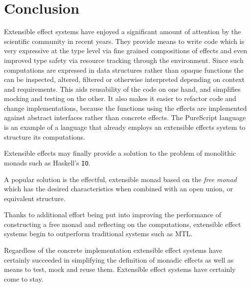 \section{Conclusion}

Extensible effect systems have enjoyed a significant amount of attention by the
scientific community in recent years. They provide means to write code which is
very expressive at the type level via fine grained compositions of effects and
even improved type safety via resource tracking through the environment. Since
such computations are expressed in data structures rather than opaque functions
the can be inspected, altered, filtered or otherwise interpreted depending on
context and requirements. This aids reusability of the code on one hand, and
simplifies mocking and testing on the other. It also makes it easier to refactor
code and change implementations, because the functions using the effects are
implemented against abstract interfaces rather than concrete effects.
The PureScript language is an example of a language that already employs
an extensible effects system to structure its computations.

Extensible effects may finally provide a solution to the problem of monolithic
monads such as Haskell's \texttt{IO}.

A popular solution is the effectful, extensible monad based on the \emph{free
  monad} which has the desired characteristics when combined with an open union,
or equivalent structure.

Thanks to additional effort being put into improving the performance of
constructing a free monad and reflecting on the computations, extensible effect
systems begin to outperform traditional systems such as MTL.

Regardless of the concrete implementation extensible effect systems have
certainly succeeded in simplifying the definition of monadic effects as well as
means to test, mock and reuse them. Extensible effect systems have certainly
come to stay.
